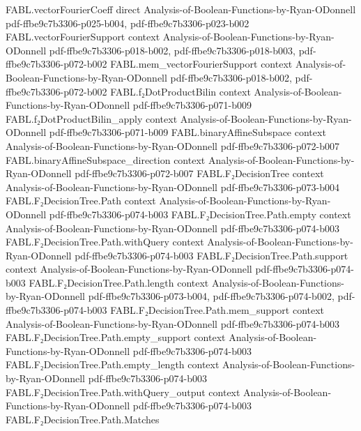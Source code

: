 \begin{theorem}
\proofstep
  {FABL.vectorFourierCoeff}
  {direct}
  {Analysis-of-Boolean-Functions-by-Ryan-ODonnell}
  {pdf-ffbe9c7b3306-p025-b004,
    pdf-ffbe9c7b3306-p023-b002}
\proofstep
  {FABL.vectorFourierSupport}
  {context}
  {Analysis-of-Boolean-Functions-by-Ryan-ODonnell}
  {pdf-ffbe9c7b3306-p018-b002,
    pdf-ffbe9c7b3306-p018-b003,
    pdf-ffbe9c7b3306-p072-b002}
\proofstep
  {FABL.mem_vectorFourierSupport}
  {context}
  {Analysis-of-Boolean-Functions-by-Ryan-ODonnell}
  {pdf-ffbe9c7b3306-p018-b002,
    pdf-ffbe9c7b3306-p072-b002}
\proofstep
  {FABL.f₂DotProductBilin}
  {context}
  {Analysis-of-Boolean-Functions-by-Ryan-ODonnell}
  {pdf-ffbe9c7b3306-p071-b009}
\proofstep
  {FABL.f₂DotProductBilin_apply}
  {context}
  {Analysis-of-Boolean-Functions-by-Ryan-ODonnell}
  {pdf-ffbe9c7b3306-p071-b009}
\proofstep
  {FABL.binaryAffineSubspace}
  {context}
  {Analysis-of-Boolean-Functions-by-Ryan-ODonnell}
  {pdf-ffbe9c7b3306-p072-b007}
\proofstep
  {FABL.binaryAffineSubspace_direction}
  {context}
  {Analysis-of-Boolean-Functions-by-Ryan-ODonnell}
  {pdf-ffbe9c7b3306-p072-b007}
\proofstep
  {FABL.F₂DecisionTree}
  {context}
  {Analysis-of-Boolean-Functions-by-Ryan-ODonnell}
  {pdf-ffbe9c7b3306-p073-b004}
\proofstep
  {FABL.F₂DecisionTree.Path}
  {context}
  {Analysis-of-Boolean-Functions-by-Ryan-ODonnell}
  {pdf-ffbe9c7b3306-p074-b003}
\proofstep
  {FABL.F₂DecisionTree.Path.empty}
  {context}
  {Analysis-of-Boolean-Functions-by-Ryan-ODonnell}
  {pdf-ffbe9c7b3306-p074-b003}
\proofstep
  {FABL.F₂DecisionTree.Path.withQuery}
  {context}
  {Analysis-of-Boolean-Functions-by-Ryan-ODonnell}
  {pdf-ffbe9c7b3306-p074-b003}
\proofstep
  {FABL.F₂DecisionTree.Path.support}
  {context}
  {Analysis-of-Boolean-Functions-by-Ryan-ODonnell}
  {pdf-ffbe9c7b3306-p074-b003}
\proofstep
  {FABL.F₂DecisionTree.Path.length}
  {context}
  {Analysis-of-Boolean-Functions-by-Ryan-ODonnell}
  {pdf-ffbe9c7b3306-p073-b004,
    pdf-ffbe9c7b3306-p074-b002,
    pdf-ffbe9c7b3306-p074-b003}
\proofstep
  {FABL.F₂DecisionTree.Path.mem_support}
  {context}
  {Analysis-of-Boolean-Functions-by-Ryan-ODonnell}
  {pdf-ffbe9c7b3306-p074-b003}
\proofstep
  {FABL.F₂DecisionTree.Path.empty_support}
  {context}
  {Analysis-of-Boolean-Functions-by-Ryan-ODonnell}
  {pdf-ffbe9c7b3306-p074-b003}
\proofstep
  {FABL.F₂DecisionTree.Path.empty_length}
  {context}
  {Analysis-of-Boolean-Functions-by-Ryan-ODonnell}
  {pdf-ffbe9c7b3306-p074-b003}
\proofstep
  {FABL.F₂DecisionTree.Path.withQuery_output}
  {context}
  {Analysis-of-Boolean-Functions-by-Ryan-ODonnell}
  {pdf-ffbe9c7b3306-p074-b003}
\proofstep
  {FABL.F₂DecisionTree.Path.Matches}

\end{theorem}
